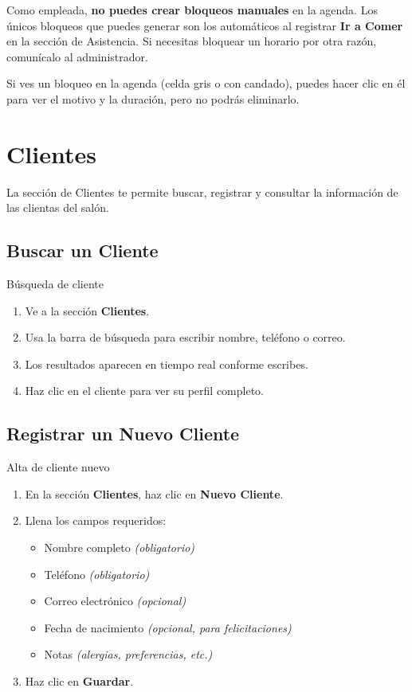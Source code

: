 \documentclass[12pt,a4paper]{article}
\begin{document}
\begin{alertabox}
Como empleada, \textbf{no puedes crear bloqueos manuales} en la agenda. Los únicos bloqueos que puedes generar son los automáticos al registrar \textbf{Ir a Comer} en la sección de Asistencia. Si necesitas bloquear un horario por otra razón, comunícalo al administrador.
\end{alertabox}

Si ves un bloqueo en la agenda (celda gris o con candado), puedes hacer clic en él para ver el motivo y la duración, pero no podrás eliminarlo.

\newpage
\section{Clientes}

La sección de Clientes te permite buscar, registrar y consultar la información de las clientas del salón.

\subsection{Buscar un Cliente}

\begin{pasobox}{Búsqueda de cliente}
\begin{enumerate}[leftmargin=*]
  \item Ve a la sección \textbf{Clientes}.
  \item Usa la barra de búsqueda para escribir nombre, teléfono o correo.
  \item Los resultados aparecen en tiempo real conforme escribes.
  \item Haz clic en el cliente para ver su perfil completo.
\end{enumerate}
\end{pasobox}

\subsection{Registrar un Nuevo Cliente}

\begin{pasobox}{Alta de cliente nuevo}
\begin{enumerate}[leftmargin=*]
  \item En la sección \textbf{Clientes}, haz clic en \textbf{Nuevo Cliente}.
  \item Llena los campos requeridos:
    \begin{itemize}
      \item Nombre completo \textit{(obligatorio)}
      \item Teléfono \textit{(obligatorio)}
      \item Correo electrónico \textit{(opcional)}
      \item Fecha de nacimiento \textit{(opcional, para felicitaciones)}
      \item Notas \textit{(alergias, preferencias, etc.)}
    \end{itemize}
  \item Haz clic en \textbf{Guardar}.
\end{enumerate}
\end{pasobox}
\end{document}

